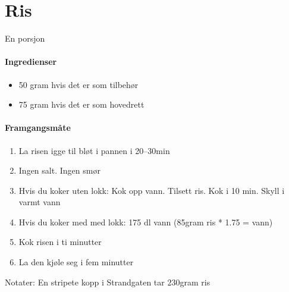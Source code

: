 \section{Ris}
\label{ris}
En porsjon

\paragraph{Ingredienser}
\begin{itemize}[noitemsep]
	\item 50 gram hvis det er som tilbehør
	\item 75 gram hvis det er som hovedrett
\end{itemize}

\paragraph{Framgangsmåte}
\begin{enumerate}[noitemsep]
	\item La risen igge til bløt i pannen i 20--30min
	\item Ingen salt. Ingen smør
	\item Hvis du koker uten lokk: Kok opp vann. Tilsett ris. Kok i 10 min. Skyll i varmt vann
	\item Hvis du koker med med lokk: 175 dl vann (85gram ris * 1.75 = vann)
	\item Kok risen i ti minutter
	\item La den kjøle seg i fem minutter
\end{enumerate}

Notater: En stripete kopp i Strandgaten tar 230gram ris
